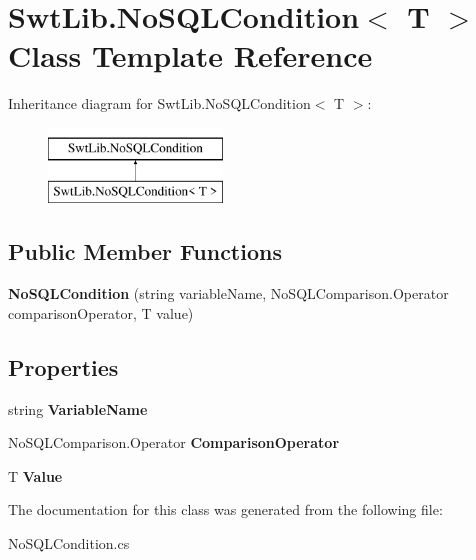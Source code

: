\hypertarget{class_swt_lib_1_1_no_s_q_l_condition_3_01_t_01_4}{\section{Swt\-Lib.\-No\-S\-Q\-L\-Condition$<$ T $>$ Class Template Reference}
\label{class_swt_lib_1_1_no_s_q_l_condition_3_01_t_01_4}
}
Inheritance diagram for Swt\-Lib.\-No\-S\-Q\-L\-Condition$<$ T $>$\-:\begin{figure}[H]
\begin{center}
\leavevmode
\includegraphics[height=2.000000cm]{class_swt_lib_1_1_no_s_q_l_condition_3_01_t_01_4}
\end{center}
\end{figure}
\subsection*{Public Member Functions}
\begin{DoxyCompactItemize}
\item 
\hypertarget{class_swt_lib_1_1_no_s_q_l_condition_3_01_t_01_4_ab8d2f23ea2009864bb8a973f4d7d0503}{{\bfseries No\-S\-Q\-L\-Condition} (string variable\-Name, No\-S\-Q\-L\-Comparison.\-Operator comparison\-Operator, T value)}\label{class_swt_lib_1_1_no_s_q_l_condition_3_01_t_01_4_ab8d2f23ea2009864bb8a973f4d7d0503}

\end{DoxyCompactItemize}
\subsection*{Properties}
\begin{DoxyCompactItemize}
\item 
\hypertarget{class_swt_lib_1_1_no_s_q_l_condition_3_01_t_01_4_a2fb2ac05d4c8ebfe22e44779b720221c}{string {\bfseries Variable\-Name}}\label{class_swt_lib_1_1_no_s_q_l_condition_3_01_t_01_4_a2fb2ac05d4c8ebfe22e44779b720221c}

\item 
\hypertarget{class_swt_lib_1_1_no_s_q_l_condition_3_01_t_01_4_a7b42a24d3ded412e244efb784ad5f81e}{No\-S\-Q\-L\-Comparison.\-Operator {\bfseries Comparison\-Operator}}\label{class_swt_lib_1_1_no_s_q_l_condition_3_01_t_01_4_a7b42a24d3ded412e244efb784ad5f81e}

\item 
\hypertarget{class_swt_lib_1_1_no_s_q_l_condition_3_01_t_01_4_ae54344945a9c5aeb1043fb6e4f623ece}{T {\bfseries Value}}\label{class_swt_lib_1_1_no_s_q_l_condition_3_01_t_01_4_ae54344945a9c5aeb1043fb6e4f623ece}

\end{DoxyCompactItemize}


The documentation for this class was generated from the following file\-:\begin{DoxyCompactItemize}
\item 
No\-S\-Q\-L\-Condition.\-cs\end{DoxyCompactItemize}
